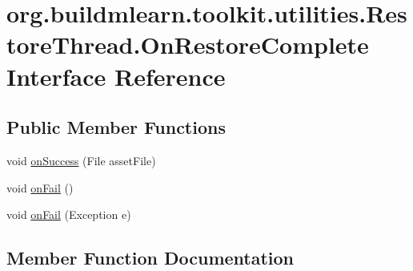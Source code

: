 \hypertarget{interfaceorg_1_1buildmlearn_1_1toolkit_1_1utilities_1_1RestoreThread_1_1OnRestoreComplete}{}\section{org.\+buildmlearn.\+toolkit.\+utilities.\+Restore\+Thread.\+On\+Restore\+Complete Interface Reference}
\label{interfaceorg_1_1buildmlearn_1_1toolkit_1_1utilities_1_1RestoreThread_1_1OnRestoreComplete}
\subsection*{Public Member Functions}
\begin{DoxyCompactItemize}
\item 
void \hyperlink{interfaceorg_1_1buildmlearn_1_1toolkit_1_1utilities_1_1RestoreThread_1_1OnRestoreComplete_a23acbe0310c224c76af6031a4f47a518}{on\+Success} (File asset\+File)
\item 
void \hyperlink{interfaceorg_1_1buildmlearn_1_1toolkit_1_1utilities_1_1RestoreThread_1_1OnRestoreComplete_a50211bbb2c91ec61f750082eaff75f65}{on\+Fail} ()
\item 
void \hyperlink{interfaceorg_1_1buildmlearn_1_1toolkit_1_1utilities_1_1RestoreThread_1_1OnRestoreComplete_a70f06b8e18a69c3663a10126811a20aa}{on\+Fail} (Exception e)
\end{DoxyCompactItemize}


\subsection{Member Function Documentation}

